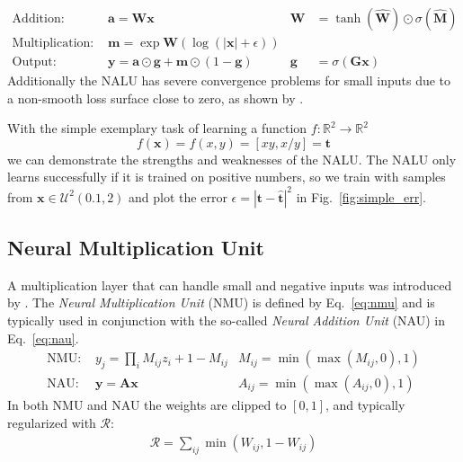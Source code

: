 \documentclass[9pt]{article}
\begin{document}
\begin{align}
  \label{eq:nalu_add}
  \text{Addition: }       & \bm a = \bm W \bm x
                          & \bm W& = \tanh(\hat{\bm W}) \odot \sigma(\hat{\bm M}) \\
  \label{eq:nalu_mult}
  \text{Multiplication: } & \bm m = \exp \bm W(\log(|\bm x|+\epsilon)) & &\\
  \text{Output: }         & \bm y = \bm a \odot \bm g + \bm m \odot (1-\bm g) 
                          & \bm g& = \sigma(\bm G\bm x)
\end{align}
Additionally the NALU has severe convergence problems for small inputs due to
a non-smooth loss surface close to zero, as shown by \cite{madsen_neural_2020}.

With the simple exemplary task of learning a function $f:\mathbb R^2 \rightarrow \mathbb R^2$
\begin{equation}
  \label{eq:xx_xdivy}
  f(\bm x) = f(x,y) = [xy,x/y] = \bm t
\end{equation}
we can demonstrate the strengths and weaknesses of the NALU.  The NALU only
learns successfully if it is trained on positive numbers, so we train with
samples from $\bm x \in \mathcal U^2(0.1,2)$ and plot the error $\epsilon =
|\bm t - \hat{\bm t}|^2$ in Fig.~\ref{fig:simple_err}.


\subsection{Neural Multiplication Unit}%
\label{sub:neural_multiplication_unit}

A multiplication layer that can handle small and negative inputs was introduced
by \citet{madsen_neural_2020}.  The \emph{Neural Multiplication Unit} (NMU) is
defined by Eq.~\ref{eq:nmu} and is typically used in conjunction with the
so-called \emph{Neural Addition Unit} (NAU) in Eq.~\ref{eq:nau}.
\begin{align}
  \label{eq:nmu}
  \text{NMU: } &y_j = \prod_i M_{ij} z_{i} + 1 - M_{ij}  &M_{ij}=\min(\max(M_{ij}, 0), 1)\\
  \label{eq:nau}
  \text{NAU: } &\bm y = \bm A \bm x &A_{ij}=\min(\max(A_{ij}, 0), 1)
\end{align}
In both NMU and NAU the weights are clipped to $[0,1]$, and typically regularized
with $\mathcal{R}$:
\begin{align}
  \label{eq:rsparse}
  \mathcal{R} = \sum_{ij} \min(W_{ij}, 1-W_{ij})
\end{align}
\end{document}
